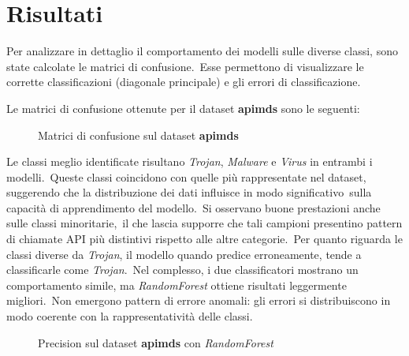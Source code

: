 \newcommand{\mtrdescription}[1]{Matrici di confusione sul dataset \textbf{#1}}
\newcommand{\prcdescription}[3]{#3 sul dataset \textbf{#1} con \textit{#2}}
\newcommand{\grpdescription}[1]{Overall accuracy, micro e macro metriche sul dataset \textbf{#1}}

\section{Risultati}

Per analizzare in dettaglio il comportamento dei modelli sulle diverse classi, sono state calcolate le matrici di confusione.\
Esse permettono di visualizzare le corrette classificazioni (diagonale principale) e gli errori di classificazione.




Le matrici di confusione ottenute per il dataset \textbf{apimds} sono le seguenti:

\begin{figure}[ht]
    \centering
    \caption{\mtrdescription{apimds}}
    \label{fig:apimds-mtrx-rf}
\end{figure}

Le classi meglio identificate risultano \textit{Trojan}, \textit{Malware} e \textit{Virus} in entrambi i modelli.\
Queste classi coincidono con quelle più rappresentate nel dataset, suggerendo che la distribuzione dei dati influisce in modo significativo\
sulla capacità di apprendimento del modello.\
Si osservano buone prestazioni anche sulle classi minoritarie,\
il che lascia supporre che tali campioni presentino pattern di chiamate API più distintivi rispetto alle altre categorie.\
Per quanto riguarda le classi diverse da \textit{Trojan}, il modello quando predice erroneamente, tende a classificarle come \textit{Trojan}.\
Nel complesso, i due classificatori mostrano un comportamento simile, ma \textit{RandomForest} ottiene risultati leggermente migliori.\
Non emergono pattern di errore anomali: gli errori si distribuiscono in modo coerente con la rappresentatività delle classi.


\begin{figure}[]
    \centering
    \caption{\prcdescription{apimds}{RandomForest}{Precision}}
    \label{fig:apimds-rf-prc}
\end{figure}

